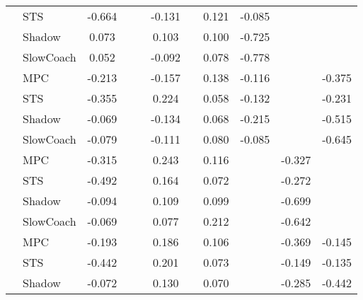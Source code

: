 \begin{tabular}{|l|l|*{9}{c|}}
                                                           & STS &   -0.664 &        &        & -0.131 &     &  0.121 &  -0.085 &      &       \\
                                                           & Shadow &    0.073 &        &        &  0.103 &     &  0.100 &  -0.725 &      &       \\
                                                           & SlowCoach &    0.052 &        &        & -0.092 &     &  0.078 &  -0.778 &      &       \\
\midrule
[True, False, False, True, False, True, True, False, True] & MPC &   -0.213 &        &        & -0.157 &     &  0.138 &  -0.116 &      &   -0.375 \\
                                                           & STS &   -0.355 &        &        &  0.224 &     &  0.058 &  -0.132 &      &   -0.231 \\
                                                           & Shadow &   -0.069 &        &        & -0.134 &     &  0.068 &  -0.215 &      &   -0.515 \\
                                                           & SlowCoach &   -0.079 &        &        & -0.111 &     &  0.080 &  -0.085 &      &   -0.645 \\
\midrule
[True, False, False, True, False, True, False, True, False] & MPC &   -0.315 &        &        &  0.243 &     &  0.116 &      &  -0.327 &       \\
                                                           & STS &   -0.492 &        &        &  0.164 &     &  0.072 &      &  -0.272 &       \\
                                                           & Shadow &   -0.094 &        &        &  0.109 &     &  0.099 &      &  -0.699 &       \\
                                                           & SlowCoach &   -0.069 &        &        &  0.077 &     &  0.212 &      &  -0.642 &       \\
\midrule
[True, False, False, True, False, True, False, True, True] & MPC &   -0.193 &        &        &  0.186 &     &  0.106 &      &  -0.369 &   -0.145 \\
                                                           & STS &   -0.442 &        &        &  0.201 &     &  0.073 &      &  -0.149 &   -0.135 \\
                                                           & Shadow &   -0.072 &        &        &  0.130 &     &  0.070 &      &  -0.285 &   -0.442 \\

\end{tabular}
